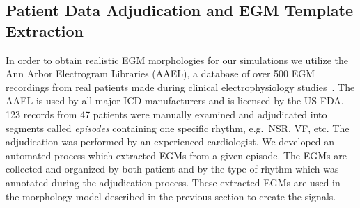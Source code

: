  \subsection{Patient Data Adjudication and EGM Template Extraction}
In order to obtain realistic \ac{EGM} morphologies for our simulations we utilize the Ann Arbor Electrogram Libraries (AAEL), a database of over 500 \ac{EGM} recordings from real patients made during clinical electrophysiology studies~\cite{AAEL}. 
The AAEL is used by all major \ac{ICD} manufacturers and is licensed by the US FDA. 
123 records from 47 patients were manually examined and adjudicated into segments called \emph{episodes} containing one specific rhythm, e.g.\, \ac{NSR}, \ac{VF}, etc. 
The adjudication was performed by an experienced cardiologist.
We developed an automated process which extracted \ac{EGM}s from a given episode. 
The \acp{EGM} are collected and organized by both patient and by the type of rhythm which was annotated during the adjudication process.
These extracted \acp{EGM} are used in the morphology model described in the previous section to create the signals.

